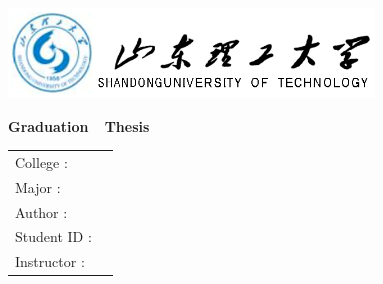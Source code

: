 {
  \setlength{\parindent}{0em}

  {
    \linespread{1}
    \begin{flushleft}
      \includegraphics[height=23.8mm]{data/cover-zh/logo.eps}
    \end{flushleft}

    \vspace{2em}
    
    {
      \heiti\sishiwu\bfseries
      \centering
      Graduation~~Thesis \par
    }
    \vspace{6em}
    
    {
      \heiti\erhao\bfseries
      \centering
      {\sduttitlee} \par
    }
    
  }

 

  \vspace{12em}

  {
    \linespread{1.6}
    \begin{center}
    \xiaosan
    \newlength{\majorlength}
    \setlength{\majorlength}{16em}
    \begin{tabular}{l l}
    College : \underline{\makebox[\majorlength]{\sdutschoole}} \\
    Major : \underline{\makebox[\majorlength]{\sdutmajore}} \\
    Author : \underline{\makebox[\majorlength]{\sdutstudentnamee}} \\
    Student ID : \underline{\makebox[\majorlength]{\sdutstudentide}} \\
    Instructor : \underline{\makebox[\majorlength]{\instructore}} \\
    \end{tabular} \par
    \end{center}
  }
  \vfill
  {
    \songti\sihao\bfseries
      \centering
      \sdutdatee \par
  }
}

